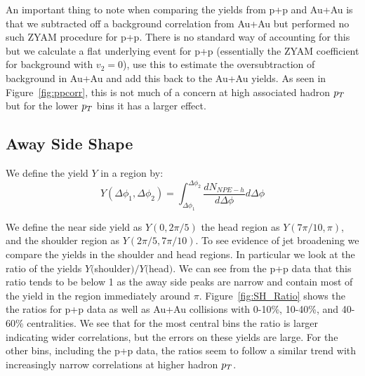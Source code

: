 An important thing to note when comparing the yields from p+p and Au+Au is that we subtracted off a background correlation from Au+Au but performed no such ZYAM procedure for p+p. There is no standard way of accounting for this but we calculate a flat underlying event for p+p (essentially the ZYAM coefficient for background with $v_2 = 0$), use this to estimate the oversubtraction of background in Au+Au and add this back to the Au+Au yields. As seen in Figure~\ref{fig:ppcorr}, this is not much of a concern at high associated hadron $p_{T}$ but for the lower $p_{T}$ bins it has a larger effect.

\subsection{Away Side Shape}

We define the yield $Y$ in a region by:
\begin{equation}\label{eq:yield}
Y(\Delta\phi_1, \Delta\phi_2) = \int^{\Delta\phi_2}_{\Delta\phi_1} \frac{dN_{NPE-h}}{d\Delta\phi} d\Delta\phi
\end{equation} 

We define the near side yield as $Y(0, 2\pi/5)$ the head region as $Y(7\pi/10, \pi)$, and the shoulder region as $Y(2\pi/5, 7\pi/10)$. To see evidence of jet broadening we compare the yields in the shoulder and head regions. In particular we look at the ratio of the yields $Y($shoulder$)/Y($head$)$. We can see from the p+p data that this ratio tends to be below 1 as the away side peaks are narrow and contain most of the yield in the region immediately around $\pi$. Figure~\ref{fig:SH_Ratio} shows the the ratios for p+p data as well as Au+Au collisions with 0-10\%, 10-40\%, and 40-60\% centralities. We see that for the most central bins the ratio is larger indicating wider correlations, but the errors on these yields are large. For the other bins, including the p+p data, the ratios seem to follow a similar trend with increasingly narrow correlations at higher hadron $p_{T}$.

